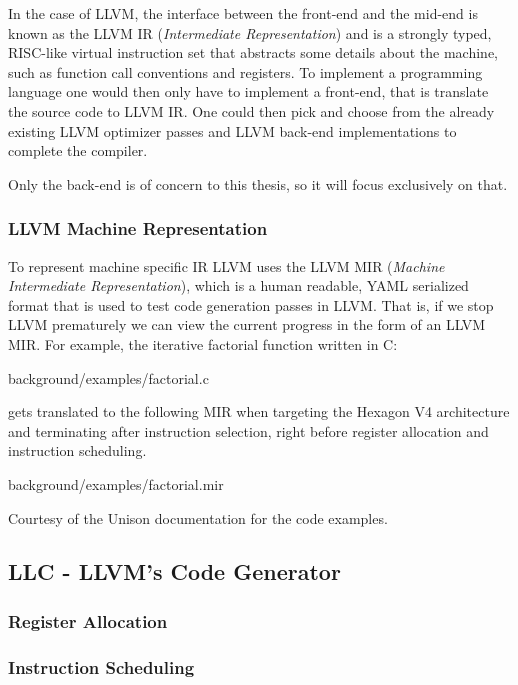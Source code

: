 In the case of LLVM, the interface between the front-end and the mid-end is known as the
LLVM IR (\textit{Intermediate Representation}) and is a strongly typed, RISC-like virtual
instruction set that abstracts some details about the machine, such as function call
conventions and registers. To implement a programming language one would then only have to
implement a front-end, that is translate the source code to LLVM IR. One could then pick 
and choose from the already existing LLVM optimizer passes and LLVM back-end implementations
to complete the compiler.

Only the back-end is of concern to this thesis, so it will focus exclusively on that.

\subsubsection{LLVM Machine Representation}

To represent machine specific IR LLVM uses the LLVM MIR (\textit{Machine Intermediate Representation}),
which is a human readable, YAML serialized format that is used to test code generation passes
in LLVM. That is, if we stop LLVM prematurely we can view the current progress in the form
of an LLVM MIR. For example, the iterative factorial function written in C:


{background/examples/factorial.c}

gets translated to the following MIR when targeting the Hexagon V4 architecture and
terminating after instruction selection, right before register allocation and instruction
scheduling.


{background/examples/factorial.mir}

Courtesy of the Unison documentation for the code examples.

\subsection{LLC - LLVM's Code Generator}

\subsubsection{Register Allocation}

\subsubsection{Instruction Scheduling}
